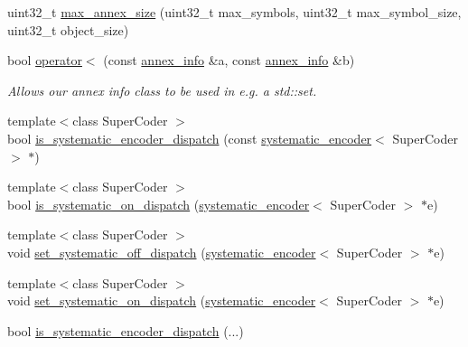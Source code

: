 \begin{DoxyCompactItemize}
\begin{DoxyCompactList}\small\item\em \end{DoxyCompactList}\item 
uint32\-\_\-t \hyperlink{namespacekodo_a716a68560b2163210d157459c98baeb7}{max\-\_\-annex\-\_\-size} (uint32\-\_\-t max\-\_\-symbols, uint32\-\_\-t max\-\_\-symbol\-\_\-size, uint32\-\_\-t object\-\_\-size)
\item 
\hypertarget{namespacekodo_af940cb8b90aae5de4d7fc89ef6c1b11b}{bool \hyperlink{namespacekodo_af940cb8b90aae5de4d7fc89ef6c1b11b}{operator$<$} (const \hyperlink{structkodo_1_1annex__info}{annex\-\_\-info} \&a, const \hyperlink{structkodo_1_1annex__info}{annex\-\_\-info} \&b)}\label{namespacekodo_af940cb8b90aae5de4d7fc89ef6c1b11b}

\begin{DoxyCompactList}\small\item\em Allows our annex info class to be used in e.\-g. a std\-::set. \end{DoxyCompactList}\item 
{\footnotesize template$<$class Super\-Coder $>$ }\\bool \hyperlink{namespacekodo_aa7bbe252fea63f6a4727b3e825b681fb}{is\-\_\-systematic\-\_\-encoder\-\_\-dispatch} (const \hyperlink{classkodo_1_1systematic__encoder}{systematic\-\_\-encoder}$<$ Super\-Coder $>$ $\ast$)
\item 
{\footnotesize template$<$class Super\-Coder $>$ }\\bool \hyperlink{namespacekodo_a20082a7f36a28a31049deb1ec8b62a0d}{is\-\_\-systematic\-\_\-on\-\_\-dispatch} (\hyperlink{classkodo_1_1systematic__encoder}{systematic\-\_\-encoder}$<$ Super\-Coder $>$ $\ast$e)
\item 
{\footnotesize template$<$class Super\-Coder $>$ }\\void \hyperlink{namespacekodo_a5c0720515a23dd6f78822f27317619bb}{set\-\_\-systematic\-\_\-off\-\_\-dispatch} (\hyperlink{classkodo_1_1systematic__encoder}{systematic\-\_\-encoder}$<$ Super\-Coder $>$ $\ast$e)
\item 
{\footnotesize template$<$class Super\-Coder $>$ }\\void \hyperlink{namespacekodo_aaf2e525aaa8dd6ce3ff2fb72b32bd876}{set\-\_\-systematic\-\_\-on\-\_\-dispatch} (\hyperlink{classkodo_1_1systematic__encoder}{systematic\-\_\-encoder}$<$ Super\-Coder $>$ $\ast$e)
\item 
bool \hyperlink{namespacekodo_a265d6235baebdcaa9f6773d4a9035f24}{is\-\_\-systematic\-\_\-encoder\-\_\-dispatch} (...)

\end{DoxyCompactItemize}
